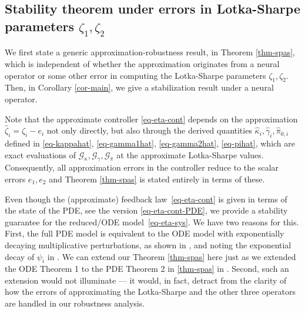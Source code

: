 \documentclass[journal,twoside,web]{ieeecolor}
\begin{document}
\subsection{Stability theorem under errors in Lotka-Sharpe parameters $\zeta_1,\zeta_2$}

We first state a generic approximation-robustness result, in Theorem \ref{thm-spas}, which is independent of whether the approximation originates from a neural operator or some other error in computing the Lotka-Sharpe parameters $\zeta_1,\zeta_2$. Then, in Corollary \ref{cor-main}, we give a stabilization result under a neural operator. 

Note that the approximate controller \eqref{eq-eta-cont} depends on the approximation $\hat\zeta_i=\zeta_i - e_i$ not only directly, but also through the derived quantities $\hat\kappa_i, \hat\gamma_i, \hat\pi_{0,i}$ defined in \eqref{eq-kappahat}, \eqref{eq-gamma1hat}, \eqref{eq-gamma2hat}, \eqref{eq-pihat}, which are exact evaluations of $\mathcal{G}_\kappa, \mathcal{G}_\gamma, \mathcal{G}_\pi$ at the approximate Lotka-Sharpe values. Consequently, all approximation errors in the controller reduce to the scalar errors $e_1, e_2$  and Theorem \ref{thm-spas} is stated entirely in terms of these.

Even though the (approximate) feedback law~\eqref{eq-eta-cont} is given in terms of the state of the PDE, see the version \eqref{eq-eta-cont-PDE}, we provide a stability guarantee for the reduced/ODE model~\eqref{eq-eta-sys}. We have two reasons for this. First, the full PDE model is equivalent to the ODE model with exponentially decaying multiplicative perturbations, as shown in \cite[(15)]{veil2025stabilization}, and noting the exponential decay of $\psi_i$ in \cite[(53), (54)]{veil2025stabilization}. We can extend our Theorem \ref{thm-spas} here just as we extended the ODE Theorem 1 to the PDE Theorem 2 in \ref{thm-spas} in \cite{veil2025stabilization}. Second, such an extension would not illuminate --- it would, in fact, detract from the clarity of how the errors of approximating the Lotka-Sharpe and the other three operators are handled in our robustness analysis. 
\end{document}
